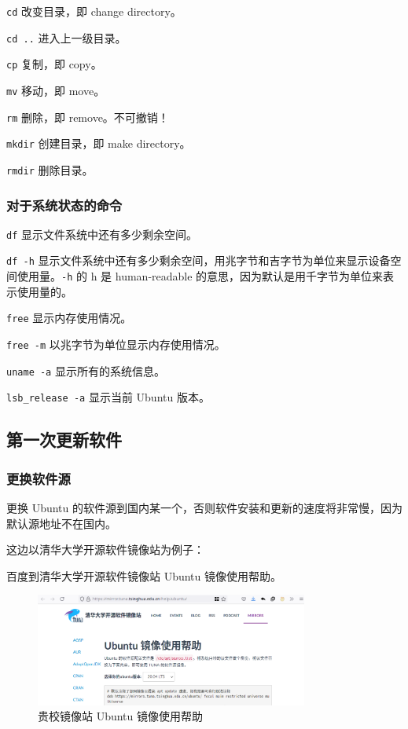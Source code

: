 \documentclass[UTF-8]{ctexart}
\begin{document}
				\texttt{cd} 改变目录，即 change directory。
				
				\texttt{cd ..} 进入上一级目录。
				
				\texttt{cp} 复制，即 copy。
				
				\texttt{mv} 移动，即 move。
				
				\texttt{rm} 删除，即 remove。不可撤销！
				
				\texttt{mkdir} 创建目录，即 make directory。
				
				\texttt{rmdir} 删除目录。
				
			\subsubsection{对于系统状态的命令}
			
				\texttt{df} 显示文件系统中还有多少剩余空间。
				
				\texttt{df -h} 显示文件系统中还有多少剩余空间，用兆字节和吉字节为单位来显示设备空间使用量。\texttt{-h} 的 h 是 human-readable 的意思，因为默认是用千字节为单位来表示使用量的。
				
				\texttt{free} 显示内存使用情况。
				
				\texttt{free -m} 以兆字节为单位显示内存使用情况。
				
				\texttt{uname -a} 显示所有的系统信息。
				
				\texttt{lsb\_release -a} 显示当前 Ubuntu 版本。
				
				
	
		\subsection{第一次更新软件}
		
			\subsubsection{更换软件源}
		
				更换 Ubuntu 的软件源到国内某一个，否则软件安装和更新的速度将非常慢，因为默认源地址不在国内。
				
				这边以清华大学开源软件镜像站为例子：
				
				百度到清华大学开源软件镜像站 Ubuntu 镜像使用帮助。
					
				\begin{figure}[H]
					\centering
					\includegraphics[width=0.8\textwidth]{fig/ubuntu_mirror_help.png}
					\caption*{贵校镜像站 Ubuntu 镜像使用帮助}
				\end{figure}
			
\end{document}
